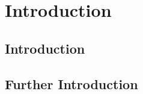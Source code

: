 
\chapter{Introduction}

\begin{tempsection}
\section{Introduction}
\section{Further Introduction}
\end{tempsection}